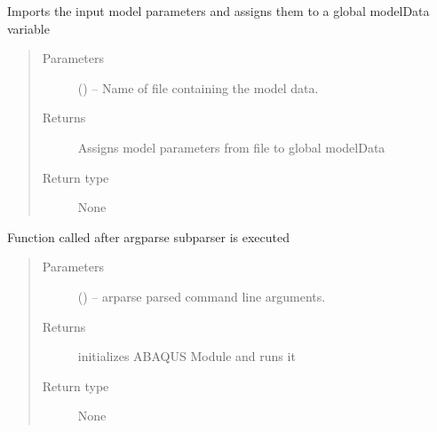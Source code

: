 \documentclass[letterpaper,10pt,english]{sphinxmanual}
\begin{document}
\begin{fulllineitems}
\label{\detokenize{MouseReferenceManual:Modules.Module_ABAQUS.importModelData}}
Imports the input model parameters and assigns them to a global modelData variable
\begin{quote}\begin{description}
\item[{Parameters}] \leavevmode
{} () -- Name of file containing the model data.

\item[{Returns}] \leavevmode
Assigns model parameters from file to global modelData

\item[{Return type}] \leavevmode
None

\end{description}\end{quote}

\end{fulllineitems}


\begin{fulllineitems}
\label{\detokenize{MouseReferenceManual:Modules.Module_ABAQUS.parserHandler}}
Function called after argparse subparser is executed
\begin{quote}\begin{description}
\item[{Parameters}] \leavevmode
{} () -- arparse parsed command line arguments.

\item[{Returns}] \leavevmode
initializes ABAQUS Module and runs it

\item[{Return type}] \leavevmode
None

\end{description}\end{quote}

\end{fulllineitems}

\end{document}

